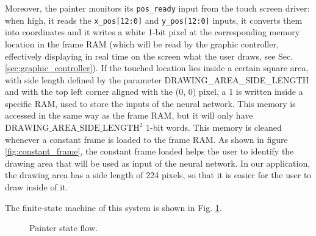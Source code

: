 \documentclass[11pt]{report}
\begin{document}
Moreover, the painter monitors its \texttt{pos\_ready} input from the touch screen driver: when high, it reads the \texttt{x\_pos[12:0]} and \texttt{y\_pos[12:0]} inputs, it converts them into coordinates and it writes a white 1-bit pixel at the corresponding memory location in the frame RAM (which will be read by the graphic controller, effectively displaying in real time on the screen what the user draws, see Sec. \ref{sec:graphic_controller}). If the touched location lies inside a certain square area, with side length defined by the parameter DRAWING\_AREA\_SIDE\_LENGTH and with the top left corner aligned with the (0, 0) pixel, a 1 is written inside a specific RAM, used to store the inputs of the neural network. This memory is accessed in the same way as the frame RAM, but it will only have $\text{DRAWING\_AREA\_SIDE\_LENGTH}^2$ 1-bit words. This memory is cleaned whenever a constant frame is loaded to the frame RAM. As shown in figure \ref{fig:constant_frame}, the constant frame loaded helps the user to identify the drawing area that will be used as input of the neural network. In our application, the drawing area has a side length of 224 pixels, so that it is easier for the user to draw inside of it.

\bigskip

The finite-state machine of this system is shown in Fig. \ref{fig:painter_fsm}.

\begin{figure}[!h]
\centering
{}
\caption{Painter state flow.}
\label{fig:painter_fsm}
\end{figure}
\end{document}
